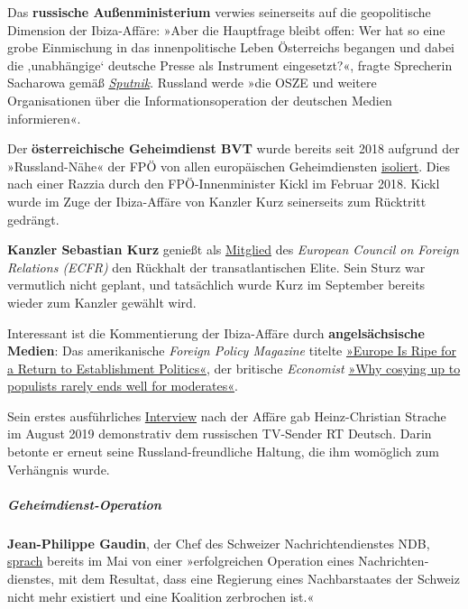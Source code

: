 Das \textbf{russische Außenministerium} verwies seinerseits auf die
geopolitische Dimension der Ibiza-Affäre: »Aber die Hauptfrage bleibt
offen: Wer hat so eine grobe Einmischung in das innenpolitische Leben
Österreichs begangen und dabei die ‚unabhängige` deutsche Presse als
Instrument eingesetzt?«, fragte Sprecherin Sacharowa gemäß
\href{https://de.sputniknews.com/politik/20190529325090595-skandal-russin-strache-video-lawrow/}{\emph{Sputnik}}.
Russland werde »die OSZE und weitere Organisationen über die
Informationsoperation der deutschen Medien informieren«.

Der \textbf{österreichische Geheimdienst BVT} wurde bereits seit 2018
aufgrund der »Russland-Nähe« der FPÖ von allen europäischen
Geheimdiensten
\href{https://derstandard.at/2000101031061/Russland-Naehe-der-FPOe-sorgt-fuer-Isolation-des-BVT-von}{isoliert}.
Dies nach einer Razzia durch den FPÖ-Innenminister Kickl im Februar
2018. Kickl wurde im Zuge der Ibiza-Affäre von Kanzler Kurz seinerseits
zum Rücktritt gedrängt.

\textbf{Kanzler Sebastian Kurz} genießt als
\href{https://www.ecfr.eu/council/}{Mitglied} des \emph{European Council
on Foreign Relations (ECFR)} den Rückhalt der transatlantischen Elite.
Sein Sturz war vermutlich nicht geplant, und tatsächlich wurde Kurz im
September bereits wieder zum Kanzler gewählt wird.

Interessant ist die Kommentierung der Ibiza-Affäre durch
\textbf{angelsächsische Medien}: Das amerikanische \emph{Foreign Policy
Magazine} titelte
\href{https://foreignpolicy.com/2019/05/23/europe-is-ripe-for-a-return-to-establishment-politics/}{»Europe
Is Ripe for a Return to Establish­ment Politics«}, der britische
\emph{Economist}
\href{https://www.economist.com/europe/2019/05/25/why-cosying-up-to-populists-rarely-ends-well-for-moderates}{»Why
cosying up to populists rarely ends well for moderates«}.

Sein erstes ausführliches
\href{https://www.youtube.com/watch?v=5BD6vYa2c9w}{Interview} nach der
Affäre gab Heinz-Christian Strache im August 2019 demonstrativ dem
russischen TV-Sender RT Deutsch. Darin betonte er erneut seine
Russland-freundliche Haltung, die ihm womöglich zum Verhängnis wurde.

\hypertarget{geheimdienst-operation}{%
\subparagraph{\texorpdfstring{\textbf{Geheimdienst-Operation}}{Geheimdienst-Operation}}\label{geheimdienst-operation}}

\textbf{Jean-Philippe Gaudin}, der Chef des Schweizer
Nachrichtendienstes NDB,
\href{https://www.nzz.ch/schweiz/das-sind-die-neun-groessten-gefahren-fuer-die-schweiz-ld.1483571}{sprach}
bereits im Mai von einer »erfolgreichen Operation eines
Nachrichten­dienstes, mit dem Resultat, dass eine Regierung eines
Nachbar­staates der Schweiz nicht mehr existiert und eine Koalition
zerbrochen ist.«

